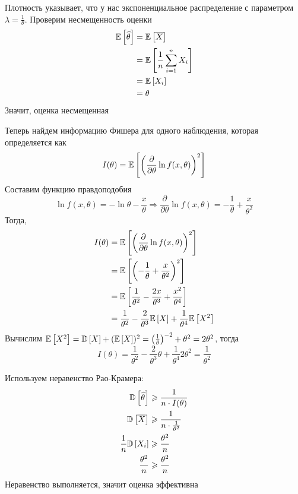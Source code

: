\documentclass{article}
\begin{document}
Плотность указывает, что у нас экспоненциальное распределение с параметром $\lambda=\frac{1}{\theta}$. Проверим несмещенность оценки
\begin{equation*}
    \begin{aligned}
        \matwait{\widehat{\theta}}&=\matwait{\overline{X}}\\
        &=\matwait{\frac{1}{n}\sum_{i=1}^nX_i}\\
        &=\matwait{X_i}\\
        &=\theta
    \end{aligned}
\end{equation*}
Значит, оценка несмещенная

Теперь найдем информацию Фишера для одного наблюдения, которая определяется как
\begin{equation*}
    I(\theta)=\mathbb{E}\left[\left(\frac{\partial}{\partial\theta}\ln f(x,\theta)\right)^2\right]
\end{equation*}
Составим функцию правдоподобия
\begin{equation*}
    \ln f(x,\theta)=-\ln\theta-\frac{x}{\theta}\Longrightarrow\frac{\partial}{\partial\theta}\ln f(x,\theta)=-\frac{1}{\theta}+\frac{x}{\theta^2}
\end{equation*}
Тогда,
\begin{equation*}
    \begin{aligned}
        I(\theta)&=\mathbb{E}\left[\left(\frac{\partial}{\partial\theta}\ln f(x,\theta)\right)^2\right]\\
        &=\mathbb{E}\left[\left(-\frac{1}{\theta}+\frac{x}{\theta^2}\right)^2\right]\\
        &=\mathbb{E}\left[\frac{1}{\theta^2}-\frac{2x}{\theta^3}+\frac{x^2}{\theta^4}\right]\\
        &=\frac{1}{\theta^2}-\frac{2}{\theta^3}\mathbb{E}\left[X\right]+\frac{1}{\theta^4}\mathbb{E}\left[X^2\right]
    \end{aligned}
\end{equation*}
Вычислим $\mathbb{E}\left[X^2\right]=\mathbb{D}\left[X\right]+(\mathbb{E}\left[X\right])^2=\left(\frac{1}{\theta}\right)^{-2}+\theta^2=2\theta^2$, тогда
\begin{equation*}
    I(\theta)=\frac{1}{\theta^2}-\frac{2}{\theta^3}\theta+\frac{1}{\theta^4}2\theta^2=\frac{1}{\theta^2}
\end{equation*}

Используем неравенство Рао-Крамера:
\begin{equation*}
    \begin{aligned}
        \mathbb{D}\left[\widehat{\theta}\right]&\geqslant\frac{1}{n\cdot I(\theta)}\\
        \mathbb{D}\left[\overline{X}\right]&\geqslant\frac{1}{n\cdot\frac{1}{\theta^2}}\\
        \frac{1}{n}\mathbb{D}\left[X_i\right]&\geqslant\frac{\theta^2}{n}\\
        \frac{\theta^2}{n}&\geqslant\frac{\theta^2}{n}
    \end{aligned}
\end{equation*}
Неравенство выполняется, значит оценка эффективна
\end{document}

